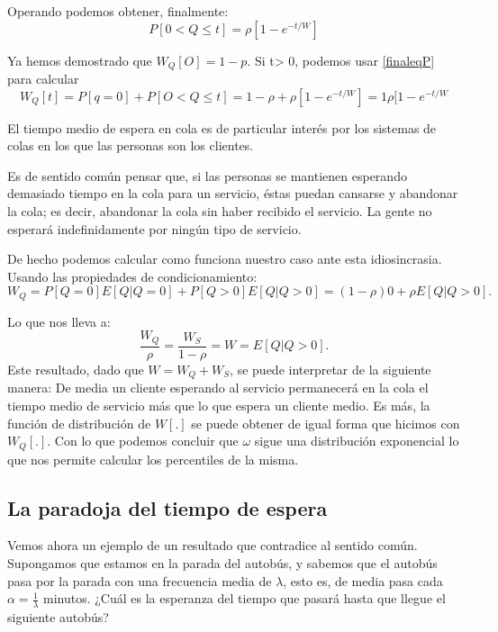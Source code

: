 \documentclass[a4paper,10pt]{scrartcl}
\theoremstyle{definition}
\numberwithin{equation}{section}
\begin{document}
	Operando podemos obtener, finalmente:
	\begin{equation*}
	P[0 < Q\le t]=\rho[1-e^{-t/W}]
	\label{finaleqP}
	\end{equation*}
	
	
	Ya hemos demostrado que $W_Q [O] = 1 - p$. Si t> 0, podemos usar \ref{finaleqP} para calcular 
	\[W_Q [t]=P [q = 0] + P [O < Q \leq t]= 1 - \rho + \rho [1 - e^{- t / W}]=1\rho[1-e^{-t/W}\]
	
	El tiempo medio de espera en cola es de particular interés por los sistemas de colas en los que las personas 
	son los clientes.
	
	Es de sentido común pensar que, si las personas se mantienen esperando demasiado tiempo en la cola 
	para un servicio, éstas puedan cansarse y abandonar la cola; es decir, abandonar la cola sin haber 
	recibido el servicio. La gente no esperará indefinidamente por ningún tipo de servicio.
	
	De hecho podemos calcular como funciona nuestro caso ante esta idiosincrasia. Usando las propiedades de condicionamiento:
	\begin{equation*}
	W_Q = P [Q = 0] E [Q|Q = 0] + P [Q > 0]E [Q|Q> 0] = (1 - \rho)  0 + \rho E [Q|Q> 0].
	\end{equation*}
	
	Lo que nos lleva a:
	\begin{equation*}
	\frac{W_Q}{\rho}=\frac{W_S}{1-\rho}=W= E [Q|Q> 0].
	\end{equation*}
	Este resultado, dado que $W=W_Q + W_S$, se puede interpretar de la siguiente manera: De media un cliente 
	esperando al servicio permanecerá en la cola el tiempo medio de servicio más que lo que espera un cliente medio.
	Es más, la función de distribución de $W[.]$ se puede obtener de igual forma que hicimos con $W_Q[.]$. Con lo
	que podemos concluir que $\omega$ sigue una distribución exponencial lo que nos permite calcular los percentiles
	de la misma.
	
	\subsection{La paradoja del tiempo de espera}
	Vemos ahora un ejemplo de un resultado que contradice al sentido común. Supongamos que estamos en la parada del autobús, y sabemos que el autobús pasa por la parada con una frecuencia media de $\lambda$, esto es, de media pasa cada $\alpha=\frac{1}{\lambda}$ minutos. ¿Cuál es la esperanza del tiempo que pasará hasta que llegue el siguiente autobús?
	
\end{document}
